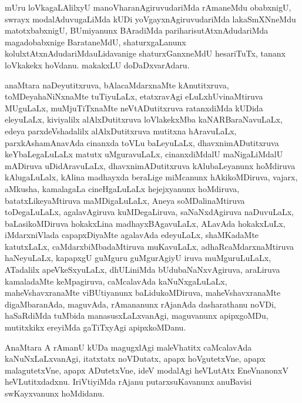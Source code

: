 \documentclass{article}
\begin{document}
\begin{mn}
mUru  loVkagaLAlilxyU  manoVharanAgiruvudariMda  rAmaneMdu  obabxnigU,  swrayx  modalAduvugaLiMda  
kUDi  yoVgayxnAgiruvudariMda  lakaSmXNneMdu  matotxbabxnigU,  BUmiyanunx  BAradiMda  pariharisutAtxnAdudariMda  
magadobabxnige  BarataneMdU,  shaturxgaLanunx  kolulxtAtxnAdudariMdauLidavanige  shaturxGanxneMdU  hesariTuTx,  
tananx  loVkakekx  hoVdanu.  makakxLU  doDaDxvarAdaru.
\end{mn}

\begin{mn}
anaMtara  naDeyutitxruva,  bAlacaMdarxnaMte  kAnutitxruva,  toMDeyahaNiNxnaMte  tuTiyuLaLx,  
etatxravAgi  eLuLxhUvinaMtiruva  MUguLaLx,  muMjuTiTxnaMte  neVtADutitxruva  ratanxdiMda  kUDida  
eleyuLaLx,  kiviyalilx  alAlxDutitxruva  loVlakekxMba  kaNARBaraNavuLaLx,  edeya  parxdeVshadalilx  
alAlxDutitxruva  mutitxna  hAravuLaLx,  parxkAshamAnavAda  cinanxda  toVLu  baLeyuLaLx,  
dhavxnimADutitxruva  keYbaLegaLuLaLx  matutx  uMguravuLaLx,  cinanxdiMdalU  maNigaLiMdalU  
mADiruva  uDidAravuLaLx,  dhavxnimADutitxruva  kAlubaLeyanunx  hoMdiruva  kAlugaLuLalx,  kAlina  
madhayxda  beraLige  miMcanunx  hAkikoMDiruva,  vajarx,  aMkusha,  kamalagaLa  cineHgaLuLaLx  
hejejxyanunx  hoMdiruva,  batatxLikeyaMtiruva  maMDigaLuLaLx,  Aneya  soMDalinaMtiruva  toDegaLuLaLx,  
agalavAgiruva  kuMDegaLiruva,  saNaNxdAgiruva  naDuvuLaLx,  baLasikoMDiruva  hokakxLina  madhayxBAgavuLaLx,  
ALavAda  hokakxLuLx,  iMdarxniVlada  capapxDiyaMte  agalavAda  edeyuLaLx,  shaMKadaMte  katutxLaLx,  
caMdarxbiMbadaMtiruva  muKavuLaLx,  adhaRcaMdarxnaMtiruva  haNeyuLaLx,  kapapxgU  guMguru guMgurAgiyU  
iruva  muMguruLuLaLx, ATadalilx  apeVkeSxyuLaLx,  dhULiniMda  bUdubaNaNxvAgiruva,  araLiruva  kamaladaMte  
keMpagiruva,  caMcalavAda  kaNuNxgaLuLaLx,  maheVshavxranaMte  viBUtiyanunx  baLidukoMDiruva,  maheVshavxranaMte  
digaMbaranAda,  maguvAda,  rAmananunx  rAjanAda  dasharathanu  noVDi,  haSaRdiMda  tuMbida  manasusxLaLxvanAgi,  
maguvanunx  apipxgoMDu,  mutitxkikx  ereyiMda  gaTiTxyAgi  apipxkoMDanu.
\end{mn}

\begin{mn}
AnaMtara  A  rAmanU  kUDa  magugxlAgi  maleVhatitx  caMcalavAda  kaNuNxLaLxvanAgi,  itatxtatx  noVDutatx,  
apapx  hoVgutetxVne,  apapx  malagutetxVne,  apapx  ADutetxVne,  ideV  modalAgi  heVLutAtx  EneVnanonxV  
heVLutitxdadxnu.  IriVtiyiMda  rAjanu  putarxsuKavanunx  anuBavisi  swKayxvanunx  hoMdidanu.
\end{mn}
\end{document}
